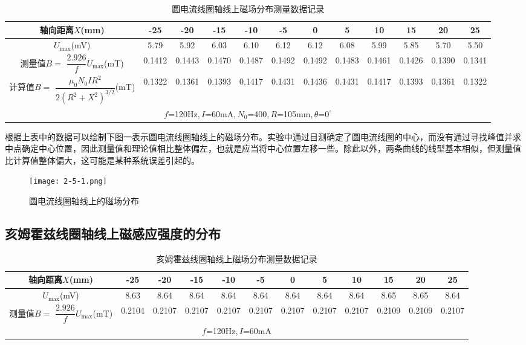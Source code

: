 \documentclass[12pt]{article}
\begin{document}
\begin{table}[htbp]
    \centering
    \begin{tabular}{|c|c|c|c|c|c|c|c|c|c|c|c|}
        \hline
        轴向距离$X$(mm) & -25  & -20  & -15  & -10  & -5   & 0    & 5    & 10   & 15   & 20   & 25 \\
        \hline
        $U_{\max}$(mV) & 5.79  & 5.92  & 6.03  & 6.10  & 6.12  & 6.12  & 6.08  & 5.99  & 5.85  & 5.70  & 5.50  \\
        \hline
        \makecell{测量值$B=$ \\ $\dfrac{2.926}{f}U_{\max}$(mT)}  & 0.1412  & 0.1443  & 0.1470  & 0.1487  & 0.1492  & 0.1492  & 0.1483  & 0.1461  & 0.1426  & 0.1390  & 0.1341  \\
        \hline
        \makecell{计算值$B=$ \\ $\dfrac{\mu_0N_0IR^2}{2(R^2+X^2)^{3/2}}$(mT)}  & 0.1322  & 0.1361  & 0.1393  & 0.1417  & 0.1431  & 0.1436  & 0.1431  & 0.1417  & 0.1393  & 0.1361  & 0.1322  \\
        \hline
        \multicolumn{12}{|c|}{$f$=120Hz,\,$I$=60mA,\,$N_0$=400,\,$R$=105mm,\,$\theta$=$0^\circ$} \\
        \hline
    \end{tabular}%
    \caption{圆电流线圈轴线上磁场分布测量数据记录}
\end{table}%

根据上表中的数据可以绘制下图一表示圆电流线圈轴线上的磁场分布。实验中通过目测确定了圆电流线圈的中心，而没有通过寻找峰值并求中点确定中心位置，因此测量值和理论值相比整体偏左，也就是应当将中心位置左移一些。除此以外，两条曲线的线型基本相似，但测量值比计算值整体偏大，这可能是某种系统误差引起的。

\begin{figure}[htbp]
    \centering
    \texttt{[image: 2-5-1.png]}
    \caption{圆电流线圈轴线上的磁场分布}
\end{figure}

\subsection{亥姆霍兹线圈轴线上磁感应强度的分布}
\begin{table}[htbp]
    \centering
    \begin{tabular}{|c|c|c|c|c|c|c|c|c|c|c|c|}
    \hline
    轴向距离$X$(mm) & -25  & -20  & -15  & -10  & -5   & 0    & 5    & 10   & 15   & 20   & 25 \\
    \hline
    $U_{\max}$(mV) & 8.63  & 8.64  & 8.64  & 8.64  & 8.64  & 8.64  & 8.64  & 8.64  & 8.65  & 8.65  & 8.64  \\
    \hline
    \makecell{测量值$B=$ \\ $\dfrac{2.926}{f}U_{\max}$(mT)}  & 0.2104  & 0.2107  & 0.2107  & 0.2107  & 0.2107  & 0.2107  & 0.2107  & 0.2107  & 0.2109  & 0.2109  & 0.2107  \\
    \hline
    \multicolumn{12}{|c|}{$f$=120Hz,\,$I$=60mA} \\
    \hline
    \end{tabular}%
    \caption{亥姆霍兹线圈轴线上磁场分布测量数据记录}
\end{table}%
\end{document}
